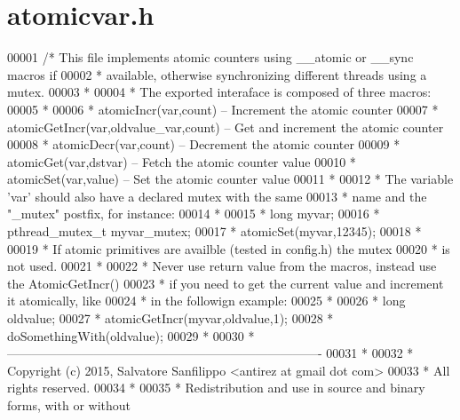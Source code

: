 \hypertarget{atomicvar_8h_source}{}\section{atomicvar.\+h}
\label{atomicvar_8h_source}

\begin{DoxyCode}
00001 \textcolor{comment}{/* This file implements atomic counters using \_\_atomic or \_\_sync macros if}
00002 \textcolor{comment}{ * available, otherwise synchronizing different threads using a mutex.}
00003 \textcolor{comment}{ *}
00004 \textcolor{comment}{ * The exported interaface is composed of three macros:}
00005 \textcolor{comment}{ *}
00006 \textcolor{comment}{ * atomicIncr(var,count) -- Increment the atomic counter}
00007 \textcolor{comment}{ * atomicGetIncr(var,oldvalue\_var,count) -- Get and increment the atomic counter}
00008 \textcolor{comment}{ * atomicDecr(var,count) -- Decrement the atomic counter}
00009 \textcolor{comment}{ * atomicGet(var,dstvar) -- Fetch the atomic counter value}
00010 \textcolor{comment}{ * atomicSet(var,value)  -- Set the atomic counter value}
00011 \textcolor{comment}{ *}
00012 \textcolor{comment}{ * The variable 'var' should also have a declared mutex with the same}
00013 \textcolor{comment}{ * name and the "\_mutex" postfix, for instance:}
00014 \textcolor{comment}{ *}
00015 \textcolor{comment}{ *  long myvar;}
00016 \textcolor{comment}{ *  pthread\_mutex\_t myvar\_mutex;}
00017 \textcolor{comment}{ *  atomicSet(myvar,12345);}
00018 \textcolor{comment}{ *}
00019 \textcolor{comment}{ * If atomic primitives are availble (tested in config.h) the mutex}
00020 \textcolor{comment}{ * is not used.}
00021 \textcolor{comment}{ *}
00022 \textcolor{comment}{ * Never use return value from the macros, instead use the AtomicGetIncr()}
00023 \textcolor{comment}{ * if you need to get the current value and increment it atomically, like}
00024 \textcolor{comment}{ * in the followign example:}
00025 \textcolor{comment}{ *}
00026 \textcolor{comment}{ *  long oldvalue;}
00027 \textcolor{comment}{ *  atomicGetIncr(myvar,oldvalue,1);}
00028 \textcolor{comment}{ *  doSomethingWith(oldvalue);}
00029 \textcolor{comment}{ *}
00030 \textcolor{comment}{ * ----------------------------------------------------------------------------}
00031 \textcolor{comment}{ *}
00032 \textcolor{comment}{ * Copyright (c) 2015, Salvatore Sanfilippo <antirez at gmail dot com>}
00033 \textcolor{comment}{ * All rights reserved.}
00034 \textcolor{comment}{ *}
00035 \textcolor{comment}{ * Redistribution and use in source and binary forms, with or without}

\end{DoxyCode}
